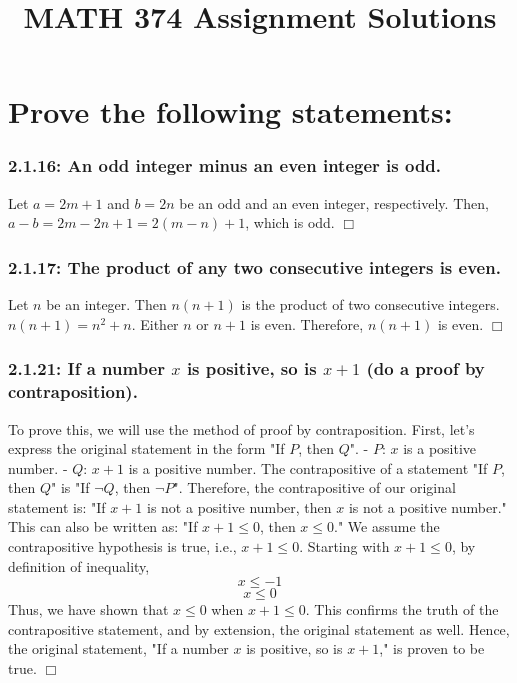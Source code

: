 \documentclass[12pt]{article}
\title{MATH 374 Assignment Solutions}
\begin{document}
\maketitle
\section*{Prove the following statements:}
\subsubsection*{2.1.16: An odd integer minus an even integer is odd.}
Let \( a = 2m + 1 \) and \( b = 2n \) be an odd and an even integer, respectively. Then, \( a - b = 2m - 2n + 1 = 2(m - n) + 1 \), which is odd. \(\Box\)

\subsubsection*{2.1.17: The product of any two consecutive integers is even.}
Let \(n\) be an integer. Then \(n(n+1)\) is the product of two consecutive integers. \(n(n+1) = n^2 + n\). Either \(n\) or \(n+1\) is even. Therefore, \(n(n+1)\) is even. \(\Box\)

\subsubsection*{2.1.21: If a number \( x \) is positive, so is \( x + 1 \) (do a proof by contraposition).}
To prove this, we will use the method of proof by contraposition.
First, let's express the original statement in the form "If \( P \), then \( Q \)".
\newline
- \( P \): \( x \) is a positive number.
\newline
- \( Q \): \( x + 1 \) is a positive number.
\newline
The contrapositive of a statement "If \( P \), then \( Q \)" is "If \( \lnot Q \), then \( \lnot P \)".
Therefore, the contrapositive of our original statement is:
\newline
"If \( x + 1 \) is not a positive number, then \( x \) is not a positive number."
\newline
This can also be written as:
"If \( x + 1 \leq 0 \), then \( x \leq 0 \)."
\newline
We assume the contrapositive hypothesis is true, i.e., \( x + 1 \leq 0 \).
\newline
Starting with \( x + 1 \leq 0 \), by definition of inequality,
\[ x \leq -1 \]
\[ x \leq 0 \]
Thus, we have shown that \( x \leq 0 \) when \( x + 1 \leq 0 \).
\newline
This confirms the truth of the contrapositive statement, and by extension, the original statement as well.
\newline
Hence, the original statement, "If a number \( x \) is positive, so is \( x + 1 \)," is proven to be true. \(\Box\)
\end{document}
